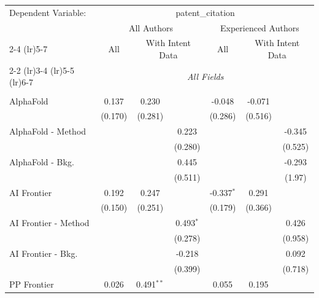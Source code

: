 \begingroup
\centering
\begin{tabular}{lcccccc}
   \tabularnewline \midrule \midrule
   Dependent Variable: & \multicolumn{6}{c}{patent\_citation}\\
 & \multicolumn{3}{c}{All Authors} & \multicolumn{3}{c}{Experienced Authors} \\
\cmidrule(lr){2-4} \cmidrule(lr){5-7}
 & \multicolumn{1}{c}{All} & \multicolumn{2}{c}{With Intent Data} & \multicolumn{1}{c}{All} & \multicolumn{2}{c}{With Intent Data} \\
\cmidrule(lr){2-2} \cmidrule(lr){3-4} \cmidrule(lr){5-5} \cmidrule(lr){6-7}
 & \multicolumn{6}{c}{\textit{All Fields}} \\ \\
   AlphaFold            & 0.137   & 0.230        &              & -0.048       & -0.071       &   \\   
                        & (0.170) & (0.281)      &              & (0.286)      & (0.516)      &   \\   
   AlphaFold - Method   &         &              & 0.223        &              &              & -0.345\\   
                        &         &              & (0.280)      &              &              & (0.525)\\   
   AlphaFold - Bkg.     &         &              & 0.445        &              &              & -0.293\\   
                        &         &              & (0.511)      &              &              & (1.97)\\   
   AI Frontier          & 0.192   & 0.247        &              & -0.337$^{*}$ & 0.291        &   \\   
                        & (0.150) & (0.251)      &              & (0.179)      & (0.366)      &   \\   
   AI Frontier - Method &         &              & 0.493$^{*}$  &              &              & 0.426\\   
                        &         &              & (0.278)      &              &              & (0.958)\\   
   AI Frontier - Bkg.   &         &              & -0.218       &              &              & 0.092\\   
                        &         &              & (0.399)      &              &              & (0.718)\\   
   PP Frontier          & 0.026   & 0.491$^{**}$ &              & 0.055        & 0.195        &   \\   

\end{tabular}
